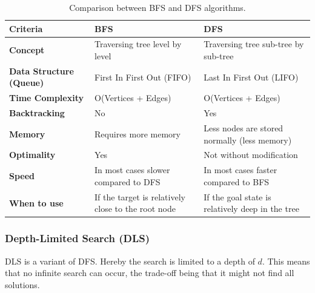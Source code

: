 \documentclass[
../../EiKI_Summary.tex,
]
{subfiles}
\begin{document}
\begin{table}[h!]
    \centering
    \begin{tabular}{|>{\raggedright\arraybackslash}m{4cm}|>{\raggedright\arraybackslash}m{5cm}|>{\raggedright\arraybackslash}m{5cm}|}
    \hline
    \textbf{Criteria} & \textbf{BFS} & \textbf{DFS} \\
    \hline
    \textbf{Concept} & Traversing tree level by level & Traversing tree sub-tree by sub-tree \\
    \hline
    \textbf{Data Structure (Queue)} & First In First Out (FIFO) & Last In First Out (LIFO) \\
    \hline
    \textbf{Time Complexity} & O(Vertices + Edges) & O(Vertices + Edges) \\
    \hline
    \textbf{Backtracking} & No & Yes \\
    \hline
    \textbf{Memory} & Requires more memory & Less nodes are stored normally (less memory) \\
    \hline
    \textbf{Optimality} & Yes & Not without modification \\
    \hline
    \textbf{Speed} & In most cases slower compared to DFS & In most cases faster compared to BFS \\
    \hline
    \textbf{When to use} & If the target is relatively close to the root node & If the goal state is relatively deep in the tree \\
    \hline
    \end{tabular}
    \caption{Comparison between BFS and DFS algorithms.}
\end{table}

\newpage
\subsubsection{Depth-Limited Search (DLS)}
DLS is a variant of DFS. Hereby the search is limited to a depth of $d$. This means that no infinite search can occur, the trade-off being that it might not find all solutions.
\end{document}
